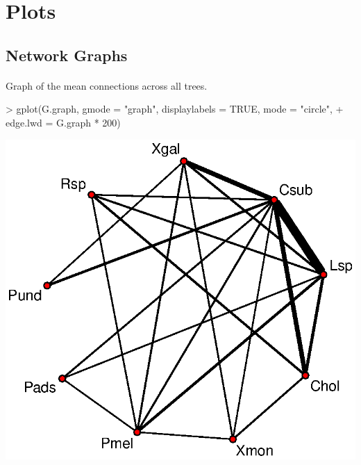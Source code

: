 \documentclass[11pt]{amsart}
\begin{document}
  


\section{Plots}


\subsection{Network Graphs}

\paragraph{}Graph of the mean connections across all trees.

\begin{Schunk}
\begin{Sinput}
> gplot(G.graph, gmode = "graph", displaylabels = TRUE, mode = "circle", 
+     edge.lwd = G.graph * 200)
\end{Sinput}
\end{Schunk}
\includegraphics{LCO_analyses-018}
\end{document}
